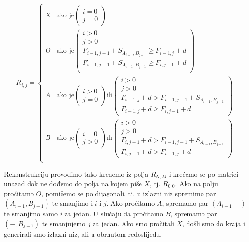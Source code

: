 \documentclass[times, utf8, zavrsni]{fer}
\begin{document}
$$
R_{i,j} = \left\{
	\begin{array}{ll}
		X & \mbox{ako je} \left( \begin{array}{l} i=0 \\ j=0 \end{array} \right) \\
		O & \mbox{ako je} \left( \begin{array}{l} i>0 \\ j>0 \\
				F_{i-1,j-1} + S_{A_{i-1}, B_{j-1}} \geq F_{i-1,j} + d \\
				F_{i-1,j-1} + S_{A_{i-1}, B_{j-1}} \geq F_{i,j-1} + d \\
			\end{array} \right) \\
		A & \mbox{ako je} \left( \begin{array}{l} i>0 \\ j=0 \end{array} \right)
			\mbox{ili} \left( \begin{array}{l} i>0 \\ j>0 \\
				F_{i-1,j} + d > F_{i-1,j-1} + S_{A_{i-1}, B_{j-1}} \\
				F_{i-1,j} + d \geq F_{i,j-1} + d
			\end{array} \right) \\
		B & \mbox{ako je} \left( \begin{array}{l} i=0 \\ j>0 \end{array} \right)
			\mbox{ili} \left( \begin{array}{l} i>0 \\ j>0 \\
				F_{i,j-1} + d > F_{i-1,j-1} + S_{A_{i-1}, B_{j-1}} \\
				F_{i,j-1} + d > F_{i-1,j} + d
			\end{array} \right) \\
	\end{array}
\right.
$$

Rekonstrukciju provodimo tako krenemo iz polja $R_{N,M}$ i krećemo se
po matrici unazad dok ne dođemo do polja na kojem piše $X$, tj. $R_{0,0}$.
Ako na polju pročitamo $O$,
pomičemo se po dijagonali, tj. u izlazni niz spremimo par $(A_{i-1}, B_{j-1})$ te
smanjimo i $i$ i $j$. Ako pročitamo $A$, spremamo par $(A_{i-1}, -)$ te smanjimo
samo $i$ za jedan. U slučaju da pročitamo $B$, spremamo par $(-, B_{j-1})$ te
smanjujemo $j$ za jedan. Ako smo pročitali $X$, došli smo do kraja i generirali
smo izlazni niz, ali u obrnutom redoslijedu. 
\end{document}
